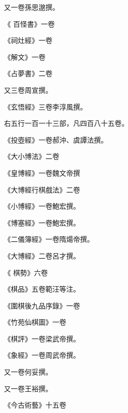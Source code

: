 \begin{pinyinscope}
 又一卷孫思邈撰。



 《
 百怪書》一卷



 《祠灶經》一卷



 《解文》一卷



 《占夢書》二卷



 又三卷周宣撰。



 《玄悟經》三卷李淳風撰。



 右五行一百一十三部，凡四百八十五卷。



 《投壺經》一卷郝沖、虞譚法撰。



 《大小博法》二卷



 《皇博經》一卷魏文帝撰



 《大博經行棋戲法》二卷



 《小博經》一卷鮑宏撰。



 《博塞經》一卷鮑宏撰。



 《二儀簿經》一卷隋煬帝撰。



 《大博經》二卷呂才撰。



 《
 棋勢》六卷



 《棋品》五卷範汪等注。



 《圍棋後九品序錄》一卷



 《竹苑仙棋圖》一卷



 《棋評》一卷梁武帝撰。



 《象經》一卷周武帝撰。



 又一卷何妥撰。



 又一卷王裕撰。



 《今古術藝》十五卷




\end{pinyinscope}

